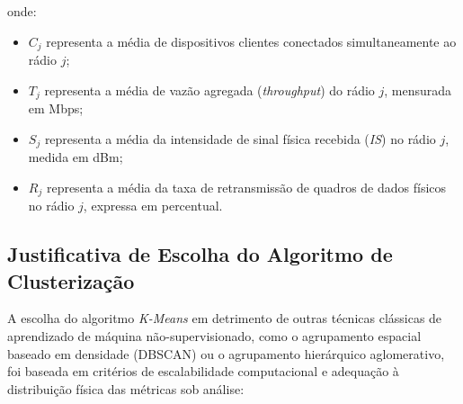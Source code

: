 onde:
\begin{itemize}
    \item $C_j$ representa a média de dispositivos clientes conectados simultaneamente ao rádio $j$;
    \item $T_j$ representa a média de vazão agregada (\textit{throughput}) do rádio $j$, mensurada em Mbps;
    \item $S_j$ representa a média da intensidade de sinal física recebida (\textit{IS}) no rádio $j$, medida em dBm;
    \item $R_j$ representa a média da taxa de retransmissão de quadros de dados físicos no rádio $j$, expressa em percentual.
\end{itemize}

\subsection{Justificativa de Escolha do Algoritmo de Clusterização}
\label{subsec:metodologia_justificativa_cluster}

A escolha do algoritmo \textit{K-Means} em detrimento de outras técnicas clássicas de aprendizado de máquina não-supervisionado, como o agrupamento espacial baseado em densidade (DBSCAN) ou o agrupamento hierárquico aglomerativo, foi baseada em critérios de escalabilidade computacional e adequação à distribuição física das métricas sob análise:

